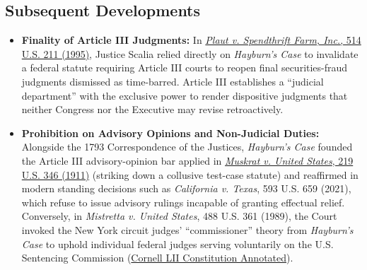 \documentclass[12pt]{article}
\begin{document}
\subsection{Subsequent Developments}

\begin{itemize}
  \item \textbf{Finality of Article III Judgments:} In \href{https://supreme.justia.com/cases/federal/us/514/211/}{\textit{Plaut v. Spendthrift Farm, Inc.}, 514 U.S. 211 (1995)}, Justice Scalia relied directly on \textit{Hayburn's Case} to invalidate a federal statute requiring Article III courts to reopen final securities-fraud judgments dismissed as time-barred. Article III establishes a ``judicial department'' with the exclusive power to render dispositive judgments that neither Congress nor the Executive may revise retroactively.
  \item \textbf{Prohibition on Advisory Opinions and Non-Judicial Duties:} Alongside the 1793 Correspondence of the Justices, \textit{Hayburn's Case} founded the Article III advisory-opinion bar applied in \href{https://supreme.justia.com/cases/federal/us/219/346/}{\textit{Muskrat v. United States}, 219 U.S. 346 (1911)} (striking down a collusive test-case statute) and reaffirmed in modern standing decisions such as \textit{California v. Texas}, 593 U.S. 659 (2021), which refuse to issue advisory rulings incapable of granting effectual relief. Conversely, in \textit{Mistretta v. United States}, 488 U.S. 361 (1989), the Court invoked the New York circuit judges' ``commissioner'' theory from \textit{Hayburn's Case} to uphold individual federal judges serving voluntarily on the U.S. Sentencing Commission (\href{https://www.law.cornell.edu/constitution-conan/article-3/section-1/inherent-powers-of-federal-courts-issuing-judgments}{Cornell LII Constitution Annotated}).

\end{itemize}
\end{document}
